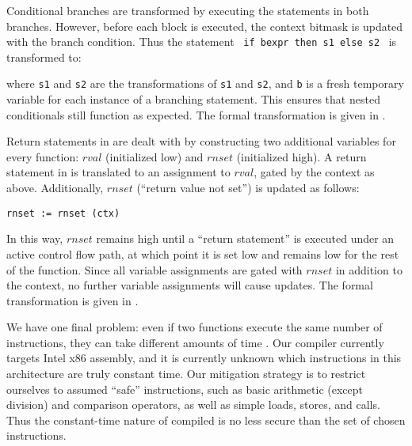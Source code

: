 Conditional branches are transformed by executing the statements in both
branches. However, before each block is executed, the context bitmask is
updated with the branch condition. Thus the statement ~\texttt{if bexpr then s1
else s2}~ is transformed to:
\begin{center}
\end{center}
where \texttt{\textlangle{}s1\textrangle} and \texttt{\textlangle{}s2\textrangle} are the transformations of \texttt{s1} and \texttt{s2}, and \texttt{b} is a fresh temporary variable for each instance of a branching
statement. This ensures that nested conditionals still function as expected.
The formal transformation is given in .

Return statements in \constc are dealt with by constructing two additional
variables for every function: $rval$ (initialized low) and $rnset$ (initialized
high). A return statement in \constc is translated to an assignment to $rval$,
gated by the context as above.  Additionally, $rnset$ (``return value not
set'') is updated as follows:
\begin{center}
  \texttt{rnset := rnset \band (\bnot ctx)}
\end{center}
In this way, $rnset$ remains high until a ``return statement'' is executed
under an active control flow path, at which point it is set low and remains low
for the rest of the function. Since all variable assignments are gated with
$rnset$ in addition to the context, no further variable assignments will cause
updates.  The formal transformation is given in .

We have one final problem: even if two functions execute the same number of
instructions, they can take different amounts of time . Our compiler
currently targets Intel x86 assembly, and it is currently unknown  which instructions in this architecture are truly constant time. Our
mitigation strategy is to restrict ourselves to assumed ``safe'' instructions,
such as basic arithmetic (except division) and comparison operators, as well as
simple loads, stores, and calls. Thus the constant-time nature of compiled
\ccore is no less secure than the set of chosen instructions.
